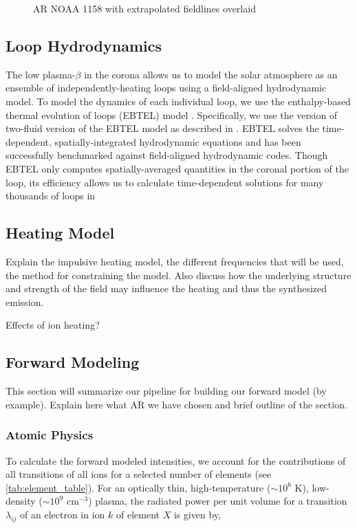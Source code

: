 \documentclass[modern,linenumbers]{aastex62}
\begin{document}
\begin{figure}
    \caption{AR NOAA 1158 with extrapolated fieldlines overlaid}
    \label{fig:magnetogram}
\end{figure}

\subsection{Loop Hydrodynamics}
\label{loops}
The low plasma-$\beta$ in the corona allows us to model the solar atmosphere as an ensemble of independently-heating loops using a field-aligned hydrodynamic model. To model the dynamics of each individual loop, we use the enthalpy-based thermal evolution of loops (EBTEL) model \citep{klimchuk_highly_2008,cargill_enthalpy-based_2012}. Specifically, we use the version of two-fluid version of the EBTEL model as described in \citep{barnes_inference_2016}. EBTEL solves the time-dependent, spatially-integrated hydrodynamic equations and has been successfully benchmarked against field-aligned hydrodynamic codes. Though EBTEL only computes spatially-averaged quantities in the coronal portion of the loop, its efficiency allows us to calculate time-dependent solutions for many thousands of loops in 


\subsection{Heating Model}
\label{heating}
Explain the impulsive heating model, the different frequencies that will be used, the method for constraining the model. Also discuss how the underlying structure and strength of the field may influence the heating and thus the synthesized emission.

Effects of ion heating?

\subsection{Forward Modeling}
\label{forward}
This section will summarize our pipeline for building our forward model (by example). Explain here what AR we have chosen and brief outline of the section.

\subsubsection{Atomic Physics}
\label{atomic}
To calculate the forward modeled intensities, we account for the contributions of all transitions of all ions for a selected number of elements (see \autoref{tab:element_table}). For an optically thin, high-temperature ($\sim10^6$ K), low-density ($\sim10^9$ cm$^{-3}$) plasma, the radiated power per unit volume for a transition $\lambda_{ij}$ of an electron in ion $k$ of element $X$ is given by,
\end{document}
